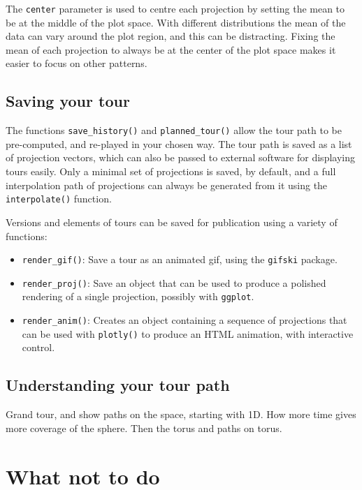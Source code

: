 \documentclass[
  letterpaper,
]{book}
\providecommand{\tightlist}{%
  \setlength{\itemsep}{0pt}\setlength{\parskip}{0pt}}\usepackage{longtable,booktabs,array}
\begin{document}
The \texttt{center} parameter is used to centre each projection by
setting the mean to be at the middle of the plot space. With different
distributions the mean of the data can vary around the plot region, and
this can be distracting. Fixing the mean of each projection to always be
at the center of the plot space makes it easier to focus on other
patterns.

\hypertarget{saving-your-tour}{%
\subsection{Saving your tour}\label{saving-your-tour}}

The functions \texttt{save\_history()} and \texttt{planned\_tour()}
allow the tour path to be pre-computed, and re-played in your chosen
way. The tour path is saved as a list of projection vectors, which can
also be passed to external software for displaying tours easily. Only a
minimal set of projections is saved, by default, and a full
interpolation path of projections can always be generated from it using
the \texttt{interpolate()} function.

Versions and elements of tours can be saved for publication using a
variety of functions:

\begin{itemize}
\tightlist
\item
  \texttt{render\_gif()}: Save a tour as an animated gif, using the
  \texttt{gifski} package.
\item
  \texttt{render\_proj()}: Save an object that can be used to produce a
  polished rendering of a single projection, possibly with
  \texttt{ggplot}.
\item
  \texttt{render\_anim()}: Creates an object containing a sequence of
  projections that can be used with \texttt{plotly()} to produce an HTML
  animation, with interactive control.
\end{itemize}

\hypertarget{understanding-your-tour-path}{%
\subsection{Understanding your tour
path}\label{understanding-your-tour-path}}

Grand tour, and show paths on the space, starting with 1D. How more time
gives more coverage of the sphere. Then the torus and paths on torus.

\hypertarget{what-not-to-do}{%
\section{What not to do}\label{what-not-to-do}}
\end{document}
